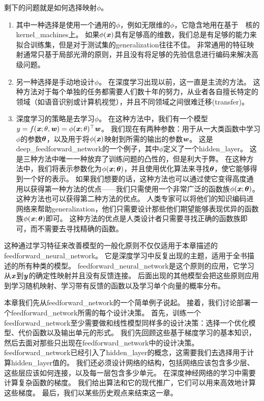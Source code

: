 剩下的问题就是如何选择映射$\phi$。
\begin{enumerate}
\item 其中一种选择是使用一个通用的$\phi$，例如无限维的$\phi$，它隐含地用在基于~~核的\gls{kernel_machines}上。
如果$\phi(\boldsymbol{\mathit{x}})$具有足够高的维数，我们总是有足够的能力来拟合训练集，但是对于测试集的\gls{generalization}往往不佳。
非常通用的特征映射通常只基于局部光滑的原则，并且没有将足够的先验信息进行编码来解决高级问题。

\item 另一种选择是手动地设计$\phi$。
在深度学习出现以前，这一直是主流的方法。
这种方法对于每个单独的任务都需要人们数十年的努力，从业者各自擅长特定的领域（如语音识别或计算机视觉），并且不同领域之间很难迁移(transfer)。

\item 深度学习的策略是去学习$\phi$。
在这种方法中，我们有一个模型$y = f(\boldsymbol{\mathit{x}};\theta, \boldsymbol{\mathit{w}}) = \phi(\boldsymbol{\mathit{x}}; \theta)^\top \boldsymbol{\mathit{w}}$。
我们现在有两种参数：用于从一大类函数中学习$\phi$的参数$\boldsymbol{\theta}$，以及用于将$\phi(\boldsymbol{\mathit{x}})$映射到所需的输出的参数$\boldsymbol{\mathit{w}}$。
这是\gls{deep_feedforward_network}的一个例子，其中$\phi$定义了一个\gls{hidden_layer}。
这是三种方法中唯一一种放弃了训练问题的凸性的，但是利大于弊。
在这种方法中，我们将表示参数化为$\phi(\boldsymbol{\mathit{x}}; \boldsymbol{\theta})$，并且使用优化算法来寻找$\boldsymbol{\theta}$，使它能够得到一个好的表示。
如果我们想要的话，这种方法也可以通过使它变得高度通用以获得第一种方法的优点——我们只需使用一个非常广泛的函数族$\phi(\boldsymbol{\mathit{x}}; \boldsymbol{\theta})$。
这种方法也可以获得第二种方法的优点。
人类专家可以将他们的知识编码进网络来帮助\gls{generalization}，他们只需要设计那些他们期望能够表现优异的函数族$\phi(\boldsymbol{\mathit{x}}; \boldsymbol{\theta})$即可。
这种方法的优点是人类设计者只需要寻找正确的函数族即可，而不需要去寻找精确的函数。
\end{enumerate}

这种通过学习特征来改善模型的一般化原则不仅仅适用于本章描述的\gls{feedforward_neural_network}。
它是深度学习中反复出现的主题，适用于全书描述的所有种类的模型。
\gls{feedforward_neural_network}是这个原则的应用，它学习从$\boldsymbol{\mathit{x}}$到$\boldsymbol{\mathit{y}}$的确定性映射并且没有反馈连接。
后面出现的其他模型会把这些原则应用到学习随机映射、学习带有反馈的函数以及学习单个向量的概率分布。


本章我们先从\gls{feedforward_network}的一个简单例子说起。
接着，我们讨论部署一个\gls{feedforward_network}所需的每个设计决策。
首先，训练一个\gls{feedforward_network}至少需要做和线性模型同样多的设计决策：选择一个优化模型、代价函数以及输出单元的形式。
我们先回顾这些基于梯度学习的基本知识，然后去面对那些只出现在\gls{feedforward_network}中的设计决策。
\gls{feedforward_network}已经引入了\gls{hidden_layer}的概念，这需要我们去选择用于计算\gls{hidden_layer}值的。
我们还必须设计网络的结构，包括网络应该包含多少层、这些层应该如何连接，以及每一层包含多少单元。
在深度神经网络的学习中需要计算复杂函数的梯度。
我们给出算法和它的现代推广，它们可以用来高效地计算这些梯度。
最后，我们以某些历史观点来结束这一章。

